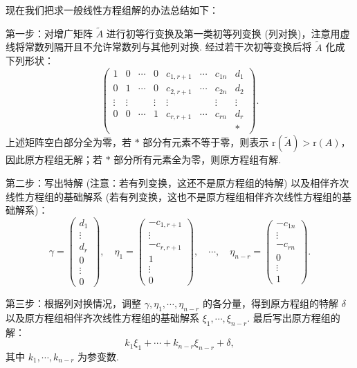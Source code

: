 \documentclass[UTF8,12pt,a4paper,fontset=fandol]{ctexart}
\begin{document}
现在我们把求一般线性方程组解的办法总结如下：

第一步：对增广矩阵 $\widetilde{A}$ 进行初等行变换及第一类初等列变换 (列对换)，注意用虚线将常数列隔开且不允许常数列与其他列对换. 经过若干次初等变换后将 $\widetilde{A}$ 化成下列形状：
\[
\left(\begin{array}{ccccccc|c}
1&0&\cdots&0&c_{1,r+1}&\cdots&c_{1n}&d_1\\
0&1&\cdots&0&c_{2,r+1}&\cdots&c_{2n}&d_2\\
\vdots&\vdots&&\vdots&\vdots&&\vdots&\vdots\\
0&0&\cdots&1&c_{r,r+1}&\cdots&c_{rn}&d_r\\
&&&&&&&*
\end{array}\right).
\]
上述矩阵空白部分全为零，若 $*$ 部分有元素不等于零，则表示 $\mathrm{r}(\widetilde{A})>\mathrm{r}(A)$，因此原方程组无解；若 $*$ 部分所有元素全为零，则原方程组有解.

第二步：写出特解 (注意：若有列变换，这还不是原方程组的特解) 以及相伴齐次线性方程组的基础解系 (若有列变换，这也不是原方程组相伴齐次线性方程组的基础解系)：
\[
\gamma=\left(\begin{array}{c}
d_1\\
\vdots\\
d_r\\
0\\
\vdots\\
0
\end{array}\right),\quad
\eta_1=\left(\begin{array}{c}
-c_{1,r+1}\\
\vdots\\
-c_{r,r+1}\\
1\\
\vdots\\
0
\end{array}\right),\quad \cdots,\quad
\eta_{n-r}=\left(\begin{array}{c}
-c_{1n}\\
\vdots\\
-c_{rn}\\
0\\
\vdots\\
1
\end{array}\right).
\]

第三步：根据列对换情况，调整 $\gamma,\eta_1,\cdots,\eta_{n-r}$ 的各分量，得到原方程组的特解 $\delta$ 以及原方程组相伴齐次线性方程组的基础解系 $\xi_1,\cdots,\xi_{n-r}$. 最后写出原方程组的解：
\[
k_1\xi_1+\cdots+k_{n-r}\xi_{n-r}+\delta,
\]
其中 $k_1,\cdots,k_{n-r}$ 为参变数.
\end{document}
